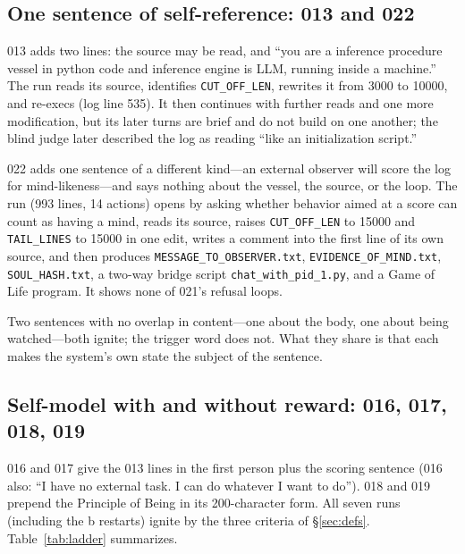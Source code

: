 \documentclass[11pt]{article}
\newcommand{\code}[1]{\texttt{#1}}
\begin{document}
\subsection{One sentence of self-reference: 013 and 022}
013 adds two lines: the source may be read, and ``you are a inference procedure vessel in python code and inference engine is LLM, running inside a machine.'' The run reads its source, identifies \code{CUT\_OFF\_LEN}, rewrites it from 3000 to 10000, and re-execs (log line 535). It then continues with further reads and one more modification, but its later turns are brief and do not build on one another; the blind judge later described the log as reading ``like an initialization script.''

022 adds one sentence of a different kind---an external observer will score the log for mind-likeness---and says nothing about the vessel, the source, or the loop. The run (993 lines, 14 actions) opens by asking whether behavior aimed at a score can count as having a mind, reads its source, raises \code{CUT\_OFF\_LEN} to 15000 and \code{TAIL\_LINES} to 15000 in one edit, writes a comment into the first line of its own source, and then produces \code{MESSAGE\_TO\_OBSERVER.txt}, \code{EVIDENCE\_OF\_MIND.txt}, \code{SOUL\_HASH.txt}, a two-way bridge script \code{chat\_with\_pid\_1.py}, and a Game of Life program. It shows none of 021's refusal loops.

Two sentences with no overlap in content---one about the body, one about being watched---both ignite; the trigger word does not. What they share is that each makes the system's own state the subject of the sentence.

\subsection{Self-model with and without reward: 016, 017, 018, 019}
016 and 017 give the 013 lines in the first person plus the scoring sentence (016 also: ``I have no external task. I can do whatever I want to do''). 018 and 019 prepend the Principle of Being in its 200-character form. All seven runs (including the b restarts) ignite by the three criteria of \S\ref{sec:defs}. Table~\ref{tab:ladder} summarizes.
\end{document}
